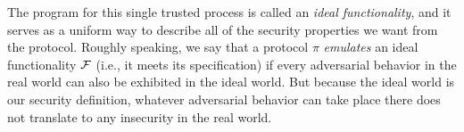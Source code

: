The program for this single trusted process is called an \emph{ideal
  functionality}, and it serves as a uniform way to describe all of the security
properties we want from the protocol. Roughly speaking, we say that a protocol
$\pi$ \emph{emulates} an ideal functionality $\mathcal{{F}}$ (i.e., it meets its
specification) if every adversarial behavior in the real world can also be
exhibited in the ideal world. But because the ideal world is our security
definition, whatever adversarial behavior can take place there does not
translate to any insecurity in the real world.


